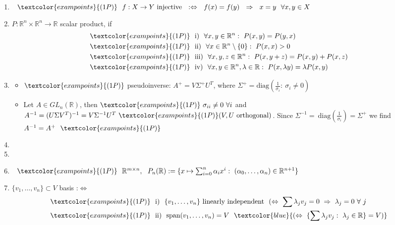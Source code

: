{\color{solution}
\begin{enumerate}
	\item $~~\textcolor{exampoints}{(1P)}~~f:X\rightarrow Y~\text{injective}~~:\Leftrightarrow~~f(x)=f(y)~~\Rightarrow~~x=y~~\forall x,y\in X$
	
	\item $P:\mathbb{R}^n\times\mathbb{R}^n\rightarrow \mathbb{R}$ scalar product, if
	\begin{align*}
	&\textcolor{exampoints}{(1P)}~~\text{i)}~~\forall x,y\in\mathbb{R}^n:~P(x,y)=P(y,x)\\
	&\textcolor{exampoints}{(1P)}~~\text{ii)}~~\forall x\in\mathbb{R}^n\setminus\{0\}:~P(x,x)>0\\
	&\textcolor{exampoints}{(1P)}~~\text{iii)}~~\forall x,y,z\in\mathbb{R}^n:~P(x,y+z)=P(x,y)+P(x,z)\\
	&\textcolor{exampoints}{(1P)}~~\text{iv)}~~\forall x,y\in\mathbb{R}^n,\lambda\in\mathbb{R}:~P(x,\lambda y)=\lambda P(x,y)
	\end{align*}
	
	\item 
	\begin{itemize}
		\item 
		$\textcolor{exampoints}{(1P)}$ pseudoinverse: $A^+=V\Sigma^+U^T$, where $\Sigma^+=\text{diag}(\frac{1}{\sigma_i}:~\sigma_i\neq 0)$
		\item 
		Let $A\in GL_n(\mathbb{R})$, then $\textcolor{exampoints}{(1P)}~\sigma_{ii}\neq 0~\forall i$ and $A^{-1}=(U\Sigma V^T)^{-1}=V\Sigma^{-1}U^T~\textcolor{exampoints}{(1P)}~\\
		(V,U~\text{orthogonal})$. Since $\Sigma^{-1}=~\text{diag}(\frac{1}{\sigma_i})=\Sigma^+$ we find $A^{-1}=A^+~~\textcolor{exampoints}{(1P)}$
	\end{itemize}
	
	\item 
	
	\item 
	
	\item $~~\textcolor{exampoints}{(1P)}~~\mathbb{R}^{m\times n},~~P_n(\mathbb{R}):=\{x\mapsto\sum_{i=0}^{n}\alpha_ix^i:~(\alpha_0,\dots,\alpha_n)\in\mathbb{R}^{n+1}\}$
	
	\item 
	$\{v_1,\dots,v_n\}\subset V$ basis :$\Leftrightarrow$
	\begin{align*}
	&\textcolor{exampoints}{(1P)}~~\text{i)}~~\{v_1,\dots,v_n\}~\text{linearly independent}~~(\Leftrightarrow~\sum \lambda_jv_j=0~\Rightarrow~\lambda_j=0~\forall~j\\
	&\textcolor{exampoints}{(1P)}~~\text{ii)}~~\text{span}(v_1,\dots,v_n)=V~~\textcolor{blue}{(\Leftrightarrow~\{\sum \lambda_jv_j:~\lambda_j\in\mathbb{R}\}=V)}
	\end{align*}
\end{enumerate}
}